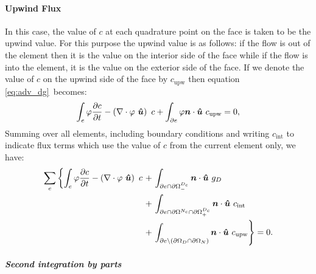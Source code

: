 \paragraph{Upwind Flux}

In this case, the value of $c$ at each quadrature point on the face is taken
to be the upwind value. For this purpose the upwind value is as follows: if
the flow is out of the element then it is the value on the interior side of
the face while if the flow is into the element, it is the value on the
exterior side of the face. If we denote the value of $c$ on the upwind side
of the face by $c_{\mathrm{upw}}$ then equation \eqref{eq:adv_dg}\ becomes:
\begin{equation}
  \int_e \varphi \frac{\partial c}{\partial t} -
    \left(\nabla\cdot \varphi~{\mbox{\boldmath$\hat u$}}\right)~c +
    \int_{\partial e} \varphi{\mbox{\boldmath$n$}}\cdot{\mbox{\boldmath$\hat u$}}~c_{\mathrm{upw}}
    = 0,
\end{equation}
Summing over all elements, including boundary conditions and writing
$c_{\mathrm{int}}$ to indicate flux terms which use the value of $c$ from the
current element only, we have:
\begin{equation}
  \begin{split}
    \sum_e \left\{ \int_e \varphi \frac{\partial c}{\partial t}
    - \left(\nabla\cdot \varphi~{\mbox{\boldmath$\hat u$}}\right)~c \right.
    &+ \left. \int_{\partial e \cap\partial\Omega^{D_c}_-} {\mbox{\boldmath$n$}}\cdot{\mbox{\boldmath$\hat u$}}~g_D \right. \\
    &+ \left. \int_{\partial e \cap\partial\Omega^{N_c}\cap\partial\Omega^{D_c}_+} {\mbox{\boldmath$n$}}\cdot{\mbox{\boldmath$\hat u$}}~c_{\mathrm{int}} \right. \\
    &+ \left. \int_{\partial e\setminus (\partial\Omega_D\cap\partial\Omega_N)}
    {\mbox{\boldmath$n$}}\cdot{\mbox{\boldmath$\hat u$}}~c_{\mathrm{upw}} \right\} =0.
    \label{eq:dg_adv_diff_integrated_once}
  \end{split}
\end{equation}

\subparagraph{Second integration by parts}

